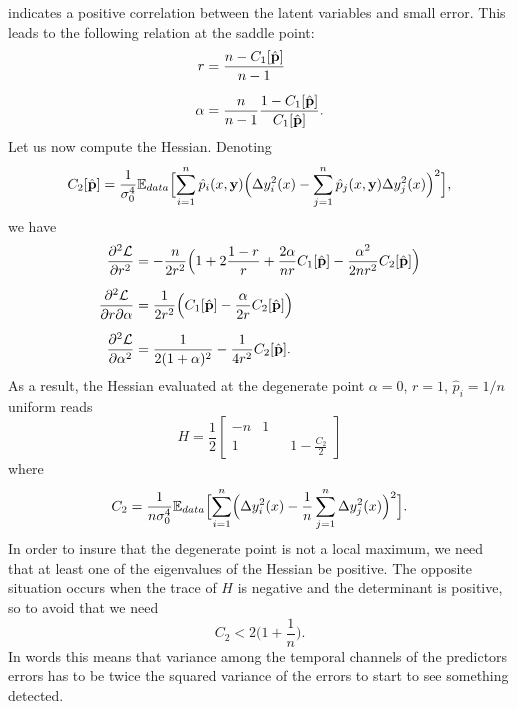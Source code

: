 \documentclass[envcountsect,runningheads]{llncs}
\theoremstyle{etoile}
\def\DD{\displaystyle}
\begin{document}
indicates a positive correlation between the latent variables and small error. 
This leads to the following relation at the saddle point:
\begin{align*}
  r &= \frac{n-C_1[\hat {\bf p}]}{n-1}\\[0.2cm]
\alpha &= \frac{n}{n-1}\frac{1-C_1[\hat {\bf p}]}{C_1[\hat {\bf p}]}.
\end{align*}
Let us now compute the Hessian. Denoting
\[
C_2[\hat {\bf p}] = \frac{1}{\sigma_0^4}{\mathbb E}_{data}\Bigl[\sum_{i=1}^n \hat p_i(x,{\bf y})\Bigl(\Delta y_i^2(x)-\sum_{j=1}^n\hat p_j(x,{\bf y})\Delta y_j^2(x)\Bigr)^2\Bigr],
\]
we have
\begin{align*}
\frac{\partial^2 {\cal L}}{\partial r^2} &= -\frac{n}{2r^2}\Bigl(1+2\frac{1-r}{r}+\frac{2\alpha}{nr}C_1[\hat {\bf p}]-\frac{\alpha^2}{2nr^2}C_2[\hat {\bf p}]\Bigr)\\[0.2cm]
\frac{\partial^2 {\cal L}}{\partial r\partial \alpha} &=\frac{1}{2r^2}\Bigl(C_1[\hat {\bf p}]-\frac{\alpha}{2r}C_2[\hat {\bf p}]\Bigr)\\[0.2cm]
\frac{\partial^2 {\cal L}}{\partial \alpha^2} &= \frac{1}{2(1+\alpha)^2}-\frac{1}{4r^2}C_2[\hat {\bf p}]. 
\end{align*}
As a result, the Hessian evaluated at the degenerate point $\alpha=0$, $r=1$, $\hat  p_i=1/n$ uniform reads
\[
H =\frac{1}{2}
\left[
  \begin{matrix}
 -n & 1\\[0.4cm] 
 1 & \qquad\DD 1-\frac{C_2}{2}
  \end{matrix}
  \right]
\]
where
\[
C_2 = \frac{1}{n\sigma_0^4}{\mathbb E}_{data}\Bigl[\sum_{i=1}^n \Bigl(\Delta y_i^2(x)-\frac{1}{n}\sum_{j=1}^n\Delta y_j^2(x)\Bigr)^2\Bigr].
\]
In order to insure that the degenerate point is not a local maximum, we need that at least one of the eigenvalues of the Hessian be positive.
The opposite situation occurs when the trace of $H$ is negative and the determinant is positive, so to avoid that we need
\[
C_2 < 2\bigl(1+\frac{1}{n}\bigr).
\]
In words this means that variance among the temporal channels of the predictors errors has to be twice the squared variance 
of the errors to start to see something detected.
\end{document}
